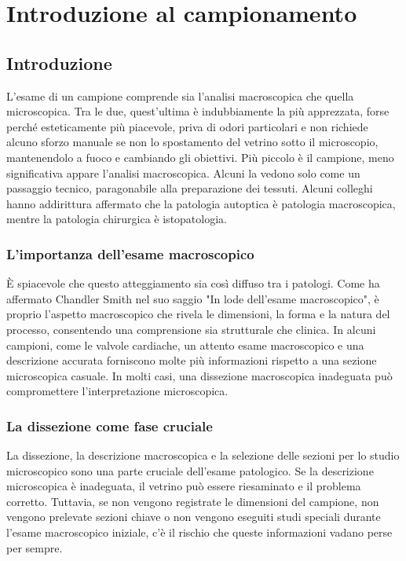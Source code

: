 
\chapter{Introduzione al campionamento}


\section{Introduzione}
L'esame di un campione comprende sia l'analisi macroscopica che quella microscopica. Tra le due, quest'ultima è indubbiamente la più apprezzata, forse perché esteticamente più piacevole, priva di odori particolari e non richiede alcuno sforzo manuale se non lo spostamento del vetrino sotto il microscopio, mantenendolo a fuoco e cambiando gli obiettivi. Più piccolo è il campione, meno significativa appare l'analisi macroscopica. Alcuni la vedono solo come un passaggio tecnico, paragonabile alla preparazione dei tessuti. Alcuni colleghi hanno addirittura affermato che la patologia autoptica è patologia macroscopica, mentre la patologia chirurgica è istopatologia.

\subsection{L'importanza dell'esame macroscopico}
È spiacevole che questo atteggiamento sia così diffuso tra i patologi. Come ha affermato Chandler Smith nel suo saggio "In lode dell'esame macroscopico", è proprio l'aspetto macroscopico che rivela le dimensioni, la forma e la natura del processo, consentendo una comprensione sia strutturale che clinica. In alcuni campioni, come le valvole cardiache, un attento esame macroscopico e una descrizione accurata forniscono molte più informazioni rispetto a una sezione microscopica casuale. In molti casi, una dissezione macroscopica inadeguata può compromettere l'interpretazione microscopica.

\subsection{La dissezione come fase cruciale}
La dissezione, la descrizione macroscopica e la selezione delle sezioni per lo studio microscopico sono una parte cruciale dell'esame patologico. Se la descrizione microscopica è inadeguata, il vetrino può essere riesaminato e il problema corretto. Tuttavia, se non vengono registrate le dimensioni del campione, non vengono prelevate sezioni chiave o non vengono eseguiti studi speciali durante l'esame macroscopico iniziale, c'è il rischio che queste informazioni vadano perse per sempre.

